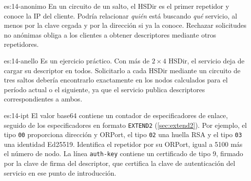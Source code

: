 \begin{soluzione}{es:14-anonimo}
En un circuito de un salto, el HSDir es el primer repetidor y conoce la IP del cliente. Podría relacionar \emph{quién} está buscando \emph{qué} servicio, al menos por la clave cegada y por la dirección si ya la conoce. Rechazar solicitudes no anónimas obliga a los clientes a obtener descriptores mediante otros repetidores.
\end{soluzione}

\begin{soluzione}{es:14-anello}
Es un ejercicio práctico. Con más de $2\times4$ HSDir, el servicio deja de cargar su descriptor en todos. Solicitarlo a cada HSDir mediante un circuito de tres saltos debería encontrarlo exactamente en los nodos calculados para el período actual o el siguiente, ya que el servicio publica descriptores correspondientes a ambos.
\end{soluzione}

\begin{soluzione}{es:14-ipt}
El valor base64 contiene un contador de especificadores de enlace, seguido de los especificadores en formato \texttt{EXTEND2} (\cref{sec:extend2}). Por ejemplo, el tipo \texttt{00} proporciona dirección y ORPort, el tipo \texttt{02} una huella RSA y el tipo \texttt{03} una identidad Ed25519. Identifica el repetidor por su ORPort, igual a 5100 más el número de nodo. La línea \texttt{auth-key} contiene un certificado de tipo 9, firmado por la clave de firma del descriptor, que certifica la clave de autenticación del servicio en ese punto de introducción.
\end{soluzione}
